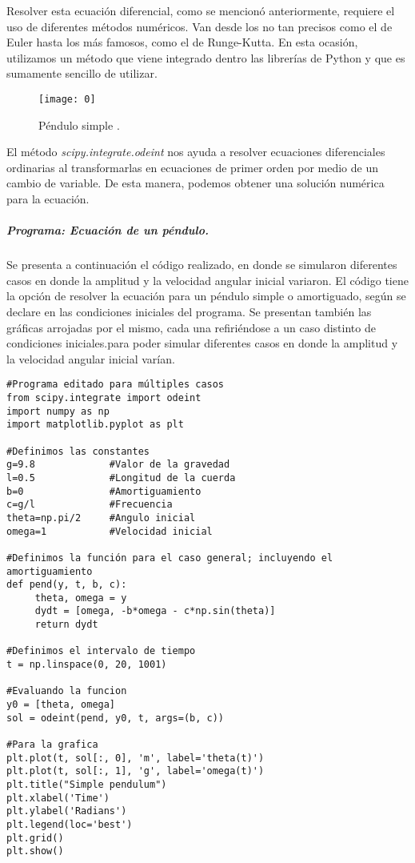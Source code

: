 \documentclass[12pt]{article}
\begin{document}
Resolver esta ecuación diferencial, como se mencionó anteriormente,  requiere el uso de diferentes métodos numéricos. Van desde los no tan precisos como el de Euler hasta los más famosos, como el de Runge-Kutta. En esta ocasión, utilizamos un método que viene integrado dentro las librerías de Python y que es sumamente sencillo de utilizar. \\

\begin{figure}[H]
\centering
\texttt{[image: 0]}
\caption{Péndulo simple \cite{P}.}
\end{figure}

El método \textit{scipy.integrate.odeint} nos ayuda a resolver ecuaciones diferenciales ordinarias al transformarlas en ecuaciones de primer orden por medio de un cambio de variable. De esta manera, podemos obtener una solución numérica para la ecuación. 

\pagebreak

\subparagraph*{Programa: Ecuación de un péndulo.}

Se presenta a continuación el código realizado, en donde se simularon diferentes casos en donde la amplitud y la velocidad angular inicial variaron. El código tiene la opción de resolver la ecuación para un péndulo simple o amortiguado, según se declare en las condiciones iniciales del programa. Se presentan también las gráficas arrojadas por el mismo, cada una refiriéndose a un caso distinto de condiciones iniciales.para poder simular diferentes casos en donde la amplitud y la velocidad angular inicial varían.

\begin{verbatim}
#Programa editado para múltiples casos
from scipy.integrate import odeint
import numpy as np
import matplotlib.pyplot as plt

#Definimos las constantes 
g=9.8             #Valor de la gravedad
l=0.5             #Longitud de la cuerda
b=0               #Amortiguamiento
c=g/l             #Frecuencia
theta=np.pi/2     #Angulo inicial
omega=1           #Velocidad inicial

#Definimos la función para el caso general; incluyendo el amortiguamiento
def pend(y, t, b, c):
     theta, omega = y
     dydt = [omega, -b*omega - c*np.sin(theta)]
     return dydt

#Definimos el intervalo de tiempo
t = np.linspace(0, 20, 1001)

#Evaluando la funcion
y0 = [theta, omega]
sol = odeint(pend, y0, t, args=(b, c))

#Para la grafica
plt.plot(t, sol[:, 0], 'm', label='theta(t)')
plt.plot(t, sol[:, 1], 'g', label='omega(t)')
plt.title("Simple pendulum")
plt.xlabel('Time')
plt.ylabel('Radians')
plt.legend(loc='best')
plt.grid()
plt.show()
\end{verbatim}
\end{document}
